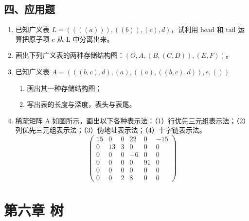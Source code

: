 \documentclass[12pt, a4paper]{article}
\begin{document}
\subsection*{四、应用题}
\begin{enumerate}
    \item 已知广义表 $L=((((a))), ((b)), (c), d)$，试利用 head 和 tail 运算把原子项 c 从 L 中分离出来。
    \item 画出下列广义表的两种存储结构图：$(O, A, (B, (C, D)), (E, F))$。
    \item 已知广义表 $A=(((b,c),d),(a),((a),((b,c),d)),e,())$
    \begin{enumerate}
        \item 画出其一种存储结构图；
        \item 写出表的长度与深度，表头与表尾。
    \end{enumerate}
    \item 稀疏矩阵 A 如图所示，画出以下各种表示法：（1）行优先三元组表示法；（2）列优先三元组表示法；（3）伪地址表示法；（4）十字链表示法。
    \[
    \begin{pmatrix}
    15 & 0 & 0 & 22 & 0 & -15 \\
    0 & 13 & 3 & 0 & 0 & 0 \\
    0 & 0 & 0 & -6 & 0 & 0 \\
    0 & 0 & 0 & 0 & 91 & 0 \\
    0 & 0 & 0 & 0 & 0 & 0 \\
    0 & 0 & 2 & 8 & 0 & 0
    \end{pmatrix}
    \]
\end{enumerate}

\section{第六章 树}
\end{document}
